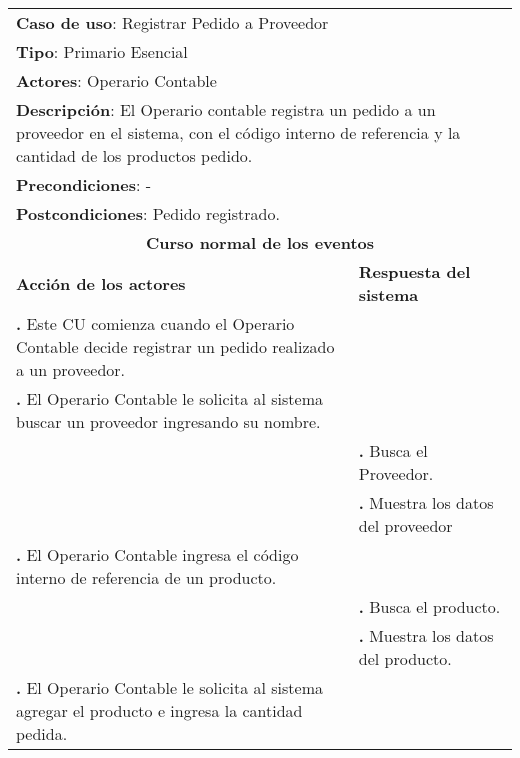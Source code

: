 \documentclass[12pt]{extarticle}
\begin{document}
    \newcommand\inc{\stepcounter{step}\textbf{\thestep. }}
    \newcommand\resetinc{\setcounter{step}{0}}
    \newcommand\raya{\noindent\rule{169mm}{0.8mm}\\}


	\begin{longtable}{ |p{8cm}|p{8cm}| }
		\hline
		\multicolumn{2}{|p{16cm}|}{\textbf{Caso de uso}: Registrar Pedido a Proveedor}\\
		\multicolumn{2}{|p{16cm}|}{\textbf{Tipo}: Primario Esencial}\\
		\multicolumn{2}{|p{16cm}|}{\textbf{Actores}: Operario Contable}\\
		\multicolumn{2}{|p{16cm}|}{\textbf{Descripción}: El Operario contable registra un pedido a un proveedor en el sistema, con el código interno de referencia y la cantidad de los productos pedido.}\\
		\multicolumn{2}{|p{16cm}|}{\textbf{Precondiciones}: -}\\
		\multicolumn{2}{|p{16cm}|}{\textbf{Postcondiciones}: Pedido registrado.}\\
		\hline
		\multicolumn{2}{|c|}{\textbf{Curso normal de los eventos}}\\
		\hline
		\textbf{Acción de los actores} & \textbf{Respuesta del sistema}\\
		\hline

			\inc Este CU comienza cuando el Operario Contable decide registrar un pedido realizado a un proveedor.& \\
			\hline
            \inc El Operario Contable le solicita al sistema buscar un proveedor ingresando su nombre.& \\
			\hline
            & \inc Busca el Proveedor.\\
			\hline
			& \inc Muestra los datos del proveedor\\
			\hline

            \inc El Operario Contable ingresa el código interno de referencia de un producto.&\\
			\hline
            & \inc Busca el producto.\\
			\hline
			& \inc Muestra los datos del producto.\\
			\hline
            \inc El Operario Contable le solicita al sistema agregar el producto e ingresa la cantidad pedida.&\\
			\hline


\end{longtable}
\end{document}
